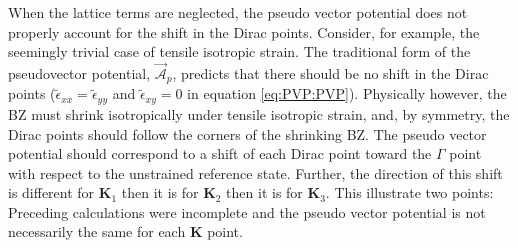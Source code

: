 When the lattice terms are neglected, the pseudo vector potential does not properly account for the shift in the Dirac points.
Consider, for example, the seemingly trivial case of tensile isotropic strain.
The traditional form of the pseudovector potential, $\vec{\mathcal{A}}_p$, predicts that there should be no shift in the Dirac points ($\tilde{\epsilon}_{xx}=\tilde{\epsilon}_{yy}$ and $\tilde{\epsilon}_{xy}=0$ in equation \ref{eq:PVP:PVP}).
Physically however, the BZ must shrink isotropically under tensile isotropic strain, and, by symmetry, the Dirac points should follow the corners of the shrinking BZ.
The pseudo vector potential should correspond to a shift of each Dirac point toward the $\Gamma$ point with respect to the unstrained reference state.
Further, the direction of this shift is different for $\bm{K}_1$ then it is for $\bm{K}_2$ then it is for $\bm{K}_3$. 
This illustrate two points: Preceding calculations were incomplete and the pseudo vector potential is not necessarily the same for each $\bm{K}$ point.

